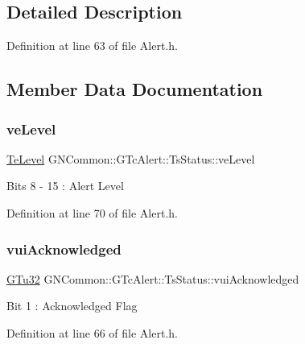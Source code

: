 \subsection{Detailed Description}


Definition at line 63 of file Alert.\+h.



\subsection{Member Data Documentation}
\mbox{\label{struct_g_n_common_1_1_g_tc_alert_1_1_ts_status_a5111d4b6b076f35d3877ea913fb48b2c}} 
\subsubsection{\texorpdfstring{ve\+Level}{veLevel}}
{\footnotesize\ttfamily \mbox{\hyperlink{class_g_n_common_1_1_g_tc_alert_a9ef9363f62aae79a7323005ab126507e}{Te\+Level}} G\+N\+Common\+::\+G\+Tc\+Alert\+::\+Ts\+Status\+::ve\+Level}

Bits 8 -\/ 15 \+: Alert Level 

Definition at line 70 of file Alert.\+h.

\mbox{\label{struct_g_n_common_1_1_g_tc_alert_1_1_ts_status_a5b40a0ae7eb67bf0348bddeebf858781}} 
\subsubsection{\texorpdfstring{vui\+Acknowledged}{vuiAcknowledged}}
{\footnotesize\ttfamily \mbox{\hyperlink{namespace_g_n_common_ae5485474bc8f23e462e920a17b377b53}{G\+Tu32}} G\+N\+Common\+::\+G\+Tc\+Alert\+::\+Ts\+Status\+::vui\+Acknowledged}

Bit 1 \+: Acknowledged Flag 

Definition at line 66 of file Alert.\+h.

